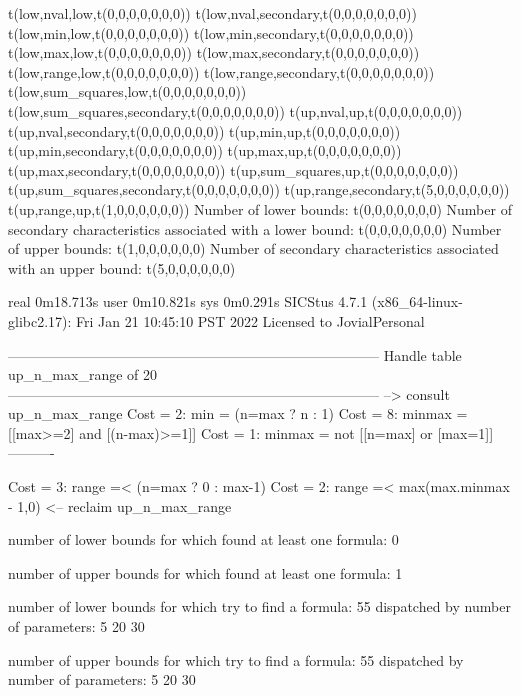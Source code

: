 t(low,nval,low,t(0,0,0,0,0,0,0))
t(low,nval,secondary,t(0,0,0,0,0,0,0))
t(low,min,low,t(0,0,0,0,0,0,0))
t(low,min,secondary,t(0,0,0,0,0,0,0))
t(low,max,low,t(0,0,0,0,0,0,0))
t(low,max,secondary,t(0,0,0,0,0,0,0))
t(low,range,low,t(0,0,0,0,0,0,0))
t(low,range,secondary,t(0,0,0,0,0,0,0))
t(low,sum_squares,low,t(0,0,0,0,0,0,0))
t(low,sum_squares,secondary,t(0,0,0,0,0,0,0))
t(up,nval,up,t(0,0,0,0,0,0,0))
t(up,nval,secondary,t(0,0,0,0,0,0,0))
t(up,min,up,t(0,0,0,0,0,0,0))
t(up,min,secondary,t(0,0,0,0,0,0,0))
t(up,max,up,t(0,0,0,0,0,0,0))
t(up,max,secondary,t(0,0,0,0,0,0,0))
t(up,sum_squares,up,t(0,0,0,0,0,0,0))
t(up,sum_squares,secondary,t(0,0,0,0,0,0,0))
t(up,range,secondary,t(5,0,0,0,0,0,0))
t(up,range,up,t(1,0,0,0,0,0,0))
Number of lower bounds:                                             t(0,0,0,0,0,0,0)
Number of secondary characteristics associated with a lower bound:  t(0,0,0,0,0,0,0)
Number of upper bounds:                                             t(1,0,0,0,0,0,0)
Number of secondary characteristics associated with an upper bound: t(5,0,0,0,0,0,0)

real	0m18.713s
user	0m10.821s
sys	0m0.291s
SICStus 4.7.1 (x86_64-linux-glibc2.17): Fri Jan 21 10:45:10 PST 2022
Licensed to JovialPersonal


--------------------------------------------------------------------------------
Handle table up_n_max_range of 20
--------------------------------------------------------------------------------
--> consult up_n_max_range
Cost =  2:  min    = (n=max ? n : 1)
Cost =  8:  minmax = [[max>=2] and [(n-max)>=1]]
Cost =  1:  minmax = not [[n=max] or [max=1]]
----------

Cost =  3:  range =< (n=max ? 0 : max-1)
Cost =  2:  range =< max(max.minmax - 1,0)
<-- reclaim up_n_max_range

number of lower bounds for which found at least one formula: 0

number of upper bounds for which found at least one formula: 1

number of lower bounds for which try to find a formula: 55
dispatched by number of parameters: 5  20  30

number of upper bounds for which try to find a formula: 55
dispatched by number of parameters: 5  20  30

